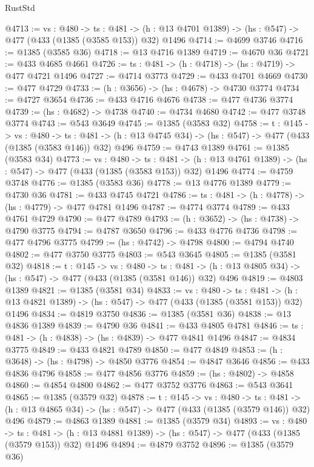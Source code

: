 \begin{lexlean}{RustStd}
\begin{coremodule}
@4713 := {vs : @480} ->
  {ts : @481} -> (h : @13 @4701 @1389) -> (hs : @547) -> @477 (@433 (@1385 (@3585 @153)) @32) @1496
@4714 := @4699 @3746
@4716 := @1385 (@3585 @36)
@4718 := @13 @4716 @1389
@4719 := @4670 @36
@4721 := @433 @4685 @4661
@4726 := {ts : @481} -> (h : @4718) -> (hs : @4719) -> @477 @4721 @1496
@4727 := @4714 @3773
@4729 := @433 @4701 @4669
@4730 := @477 @4729
@4733 := (h : @3656) -> (hs : @4678) -> @4730 @3774
@4734 := @4727 @3654
@4736 := @433 @4716 @4676
@4738 := @477 @4736 @3774
@4739 := (hs : @4682) -> @4738
@4740 := @4734 @4680
@4742 := @477 @3748 @3774
@4743 := @543 @3649
@4745 := @1385 (@3583 @32)
@4758 := {t : @145} ->
  {vs : @480} ->
  {ts : @481} -> (h : @13 @4745 @34) -> (hs : @547) -> @477 (@433 (@1385 (@3583 @146)) @32) @496
@4759 := @4743 @1389
@4761 := @1385 (@3583 @34)
@4773 := {vs : @480} ->
  {ts : @481} -> (h : @13 @4761 @1389) -> (hs : @547) -> @477 (@433 (@1385 (@3583 @153)) @32) @1496
@4774 := @4759 @3748
@4776 := @1385 (@3583 @36)
@4778 := @13 @4776 @1389
@4779 := @4730 @36
@4781 := @433 @4745 @4721
@4786 := {ts : @481} -> (h : @4778) -> (hs : @4779) -> @477 @4781 @1496
@4787 := @4774 @3774
@4789 := @433 @4761 @4729
@4790 := @477 @4789
@4793 := (h : @3652) -> (hs : @4738) -> @4790 @3775
@4794 := @4787 @3650
@4796 := @433 @4776 @4736
@4798 := @477 @4796 @3775
@4799 := (hs : @4742) -> @4798
@4800 := @4794 @4740
@4802 := @477 @3750 @3775
@4803 := @543 @3645
@4805 := @1385 (@3581 @32)
@4818 := {t : @145} ->
  {vs : @480} ->
  {ts : @481} -> (h : @13 @4805 @34) -> (hs : @547) -> @477 (@433 (@1385 (@3581 @146)) @32) @496
@4819 := @4803 @1389
@4821 := @1385 (@3581 @34)
@4833 := {vs : @480} ->
  {ts : @481} -> (h : @13 @4821 @1389) -> (hs : @547) -> @477 (@433 (@1385 (@3581 @153)) @32) @1496
@4834 := @4819 @3750
@4836 := @1385 (@3581 @36)
@4838 := @13 @4836 @1389
@4839 := @4790 @36
@4841 := @433 @4805 @4781
@4846 := {ts : @481} -> (h : @4838) -> (hs : @4839) -> @477 @4841 @1496
@4847 := @4834 @3775
@4849 := @433 @4821 @4789
@4850 := @477 @4849
@4853 := (h : @3648) -> (hs : @4798) -> @4850 @3776
@4854 := @4847 @3646
@4856 := @433 @4836 @4796
@4858 := @477 @4856 @3776
@4859 := (hs : @4802) -> @4858
@4860 := @4854 @4800
@4862 := @477 @3752 @3776
@4863 := @543 @3641
@4865 := @1385 (@3579 @32)
@4878 := {t : @145} ->
  {vs : @480} ->
  {ts : @481} -> (h : @13 @4865 @34) -> (hs : @547) -> @477 (@433 (@1385 (@3579 @146)) @32) @496
@4879 := @4863 @1389
@4881 := @1385 (@3579 @34)
@4893 := {vs : @480} ->
  {ts : @481} -> (h : @13 @4881 @1389) -> (hs : @547) -> @477 (@433 (@1385 (@3579 @153)) @32) @1496
@4894 := @4879 @3752
@4896 := @1385 (@3579 @36)

\end{coremodule}
\end{lexlean}

